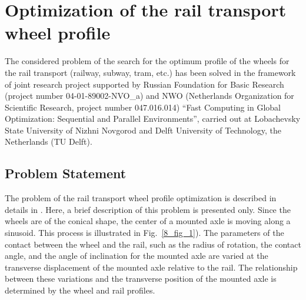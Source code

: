 

\section{Optimization of the rail transport wheel profile}

The considered problem of the search for the optimum profile of the wheels for the rail transport (railway, subway, tram, etc.) has been solved in the framework of joint research project supported by Russian Foundation for Basic Research (project number 04-01-89002-NVO\_a) and NWO (Netherlands Organization for Scientific Research, project number 047.016.014)  ``Fast Computing in Global Optimization: Sequential and Parallel Environments'', carried out at Lobachevsky State University of Nizhni Novgorod and Delft University of Technology, the Netherlands (TU Delft).

\subsection{Problem Statement}

The problem of the rail transport wheel profile optimization is described in details in \cite{8_Markine2005,8_Markine2007}. Here, a brief description of this problem is presented only. Since the wheels are of the conical shape, the center of a mounted axle is moving along a sinusoid. This process is illustrated in Fig.~\ref{8_fig_1}). The parameters of the contact between the wheel and the rail, such as the radius of rotation, the contact angle, and the angle of inclination for the mounted axle are varied at the transverse displacement of the mounted axle relative to the rail. The relationship between these variations and the transverse position of the mounted axle is determined by the wheel and rail profiles.

